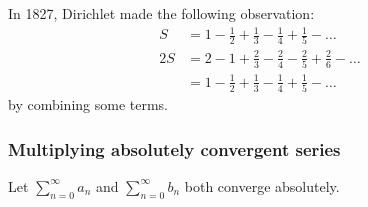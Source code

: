 \begin{remark}
    In 1827, Dirichlet made the following observation:
    \begin{align*}
        S &= 1 - \frac{1}{2} + \frac{1}{3} - \frac{1}{4} + \frac{1}{5} - \dots \\ 
        2S &= 2 - 1 + \frac{2}{3} - \frac{2}{4} - \frac{2}{5} + \frac{2}{6} - \dots \\
        &= 1 - \frac{1}{2} + \frac{1}{3} - \frac{1}{4} + \frac{1}{5} - \dots 
    \end{align*}
    by combining some terms.
\end{remark}

\subsubsection{Multiplying absolutely convergent series}
Let \(\sum_{n=0}^{\infty}  a_n \) and \(\sum_{n=0}^{\infty}  b_n \) both converge absolutely.

